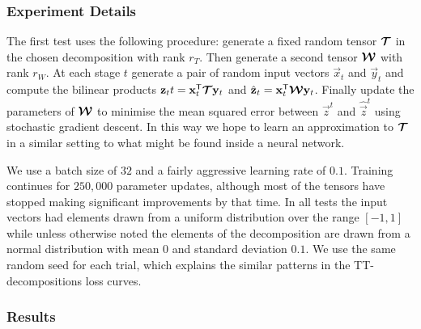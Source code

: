 \subsubsection{Experiment Details}
The first test uses the following procedure: generate a fixed random tensor \(\bm{\mathcal{T}}\)
in the chosen decomposition with rank \(r_T\). Then generate a second tensor \(\bm{\mathcal{W}}\) 
with rank \(r_W\). At each stage \(t\) generate a pair of random input vectors \(\vec{x}_t\) and
\(\vec{y}_t\) and compute the bilinear products 
\(\mathbf{z}_tt = \mathbf{x}_t^\mathsf{T}\bm{\mathcal{T}}\mathbf{y}_t\) and 
\(\hat{\mathbf{z}}_t = \mathbf{x}_t^\mathsf{T}\bm{\mathcal{W}}\mathbf{y}_t\). Finally update the parameters of
\(\bm{\mathcal{W}}\) to minimise the mean squared error between \(\vec{z}^t\) and \(\hat{\vec{z}}^t\)
using stochastic gradient descent. In this way we hope to learn an approximation to 
\(\bm{\mathcal{T}}\) in a similar setting to what might be found inside a neural network.

We use a batch size of \(32\) and a fairly aggressive
 learning rate of \(0.1\).
Training continues for \(250,000\) parameter updates, although most of the tensors have stopped
making significant improvements by that time. In all tests the input vectors had elements drawn
from a uniform distribution over the range \([-1,1]\) while unless otherwise noted the elements of
the decomposition are drawn from a normal distribution with mean \(0\) and standard deviation
\(0.1\). We use the same random seed for each trial, which explains the similar patterns in the
TT-decompositions loss curves.

\subsubsection{Results}

